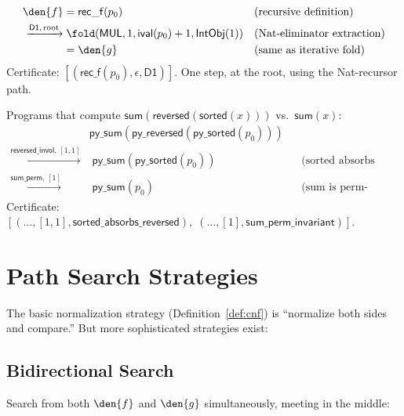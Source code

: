 \begin{example}
\begin{align}
  \den{f} &= \mathsf{rec\_f}(p_0)
    && \text{(recursive definition)} \\
  \xrightarrow{\mathsf{D1},\, \text{root}} &\;
    \fold(\mathsf{MUL}, 1, \mathsf{ival}(p_0)+1, \mathsf{IntObj}(1))
    && \text{(Nat-eliminator extraction)} \\
  &= \den{g}
    && \text{(same as iterative fold)}
\end{align}
Certificate: $[(\mathsf{rec\_f}(p_0), \epsilon, \mathsf{D1})]$.
One step, at the root, using the Nat-recursor path.
\end{example}

\begin{example}
Programs that compute $\mathsf{sum}(\mathsf{reversed}(\mathsf{sorted}(x)))$
vs.\ $\mathsf{sum}(x)$:
\begin{align}
  &\mathsf{py\_sum}(\mathsf{py\_reversed}(\mathsf{py\_sorted}(p_0))) \\
  \xrightarrow{\mathsf{reversed\_invol},\, [1,1]} &\;
    \mathsf{py\_sum}(\mathsf{py\_sorted}(p_0))
    && \text{(sorted absorbs reversed)} \\
  \xrightarrow{\mathsf{sum\_perm},\, [1]} &\;
    \mathsf{py\_sum}(p_0)
    && \text{(sum is perm-invariant)}
\end{align}
Certificate: $[(\ldots, [1,1], \mathsf{sorted\_absorbs\_reversed}),\;
(\ldots, [1], \mathsf{sum\_perm\_invariant})]$.
\end{example}

\section{Path Search Strategies}

The basic normalization strategy (Definition~\ref{def:cnf}) is
``normalize both sides and compare.''  But more sophisticated
strategies exist:

\subsection{Bidirectional Search}

Search from both $\den{f}$ and $\den{g}$ simultaneously,
meeting in the middle:

